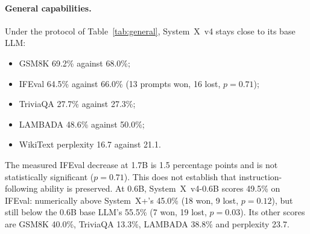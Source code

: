 \documentclass[11pt]{article}
\newcommand{\sysplus}{System~X+}
\newcommand{\sysfour}{System~X~v4}
\newcommand{\sysfoursmall}{System~X~v4-0.6B}
\begin{document}
\paragraph{General capabilities.} Under the protocol of Table~\ref{tab:general}, \sysfour{} stays close to its base LLM:
\begin{itemize}
\item GSM8K 69.2\% against 68.0\%;
\item IFEval 64.5\% against 66.0\% (13 prompts won, 16 lost, $p=0.71$);
\item TriviaQA 27.7\% against 27.3\%;
\item LAMBADA 48.6\% against 50.0\%;
\item WikiText perplexity 16.7 against 21.1.
\end{itemize}
The measured IFEval decrease at 1.7B is 1.5 percentage points and is not statistically significant ($p=0.71$). This does not establish that instruction-following ability is preserved. At 0.6B, \sysfoursmall{} scores 49.5\% on IFEval: numerically above \sysplus{}'s 45.0\% (18 won, 9 lost, $p=0.12$), but still below the 0.6B base LLM's 55.5\% (7 won, 19 lost, $p=0.03$). Its other scores are GSM8K 40.0\%, TriviaQA 13.3\%, LAMBADA 38.8\% and perplexity 23.7.

\end{document}
